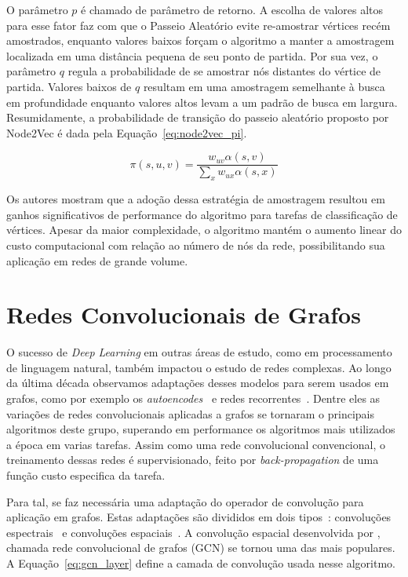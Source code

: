 O parâmetro $p$ é chamado de parâmetro de retorno.
A escolha de valores altos para esse fator faz com que o Passeio Aleatório evite
re-amostrar vértices recém amostrados, enquanto valores baixos forçam o
algoritmo a manter a amostragem localizada em uma distância pequena de seu ponto
de partida.
Por sua vez, o parâmetro $q$ regula a probabilidade de se amostrar nós distantes
do vértice de partida.
Valores baixos de $q$ resultam em uma amostragem semelhante à busca em
profundidade enquanto valores altos levam a um padrão de busca em largura.
Resumidamente, a probabilidade de transição do passeio aleatório proposto por
Node2Vec é dada pela Equação~\ref{eq:node2vec_pi}.

\begin{equation} \label{eq:node2vec_pi}
    \pi(s, u, v) = \frac{w_{uv} \alpha(s,v)}{\sum_{x} w_{ux} \alpha(s,x)}
\end{equation}

Os autores mostram que a adoção dessa estratégia de amostragem resultou em
ganhos significativos de performance do algoritmo para tarefas de classificação
de vértices.
Apesar da maior complexidade, o algoritmo mantém o aumento linear do custo
computacional com relação ao número de nós da rede, possibilitando sua aplicação
em redes de grande volume.

\section{Redes Convolucionais de Grafos}

O sucesso de \textit{Deep Learning} em outras áreas de estudo, como em
processamento de linguagem natural, também impactou o estudo de redes complexas.
Ao longo da última década observamos adaptações desses modelos para serem usados
em grafos, como por exemplo os \textit{autoencodes}~\cite{wang16}\cite{cao16}
e redes recorrentes~\cite{scarselli08}\cite{you18}.
Dentre eles as variações de redes convolucionais aplicadas a grafos se tornaram
o principais algoritmos deste grupo, superando em performance os algoritmos mais
utilizados a época em varias tarefas.
Assim como uma rede convolucional convencional, o treinamento dessas redes é
supervisionado, feito por \textit{back-propagation} de uma função custo especifica
da tarefa.

Para tal, se faz necessária uma adaptação do operador de convolução para aplicação
em grafos. Estas adaptações são divididos em dois tipos~\cite{zhang20}: convoluções
espectrais~\cite{bruna13}\cite{defferrard16} e convoluções espaciais~\cite{kipf16}.
A convolução espacial desenvolvida por \citet{kipf16}, chamada rede
convolucional de grafos (GCN) se tornou uma das mais populares.
A Equação~\ref{eq:gcn_layer} define a camada de convolução usada nesse
algoritmo.

